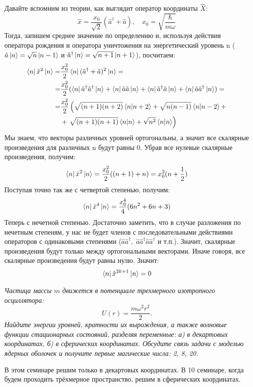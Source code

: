 Давайте вспомним из теории, как выглядит оператор координаты $\hat X$: 
\[
\hat x = \frac{x_0}{\sqrt{2}}(\hat a^{\dagger} + \hat a),\quad x_0 = \sqrt{\frac{\hbar}{m\omega}}
\]
Тогда, запишем среднее значение по определению и, используя действия оператора рождения и оператора уничтожения на энергетический уровень n ($\hat a\ket{n} = \sqrt{n}\ket{n-1}$ и $\hat{a}^{\dagger}\ket{n} = \sqrt{n+1}\ket{n+1}$), посчитаем:
\begin{align*}
    \bra{n}\hat x^2 \ket{n} = &\frac{x^2_0}{2}\bra{n}(\hat a^{\dagger} + \hat a)^2\ket{n} =\\
    = &\frac{x^2_0}{2}(\bra{n}\hat a^{\dagger}\hat a^{\dagger}\ket{n} +\bra{n}\hat a\hat a\ket{n} + \bra{n}\hat a^{\dagger}\hat a\ket{n} + \bra{n}\hat a\hat a^{\dagger}\ket{n}) =\\
    = &\frac{x^2_0}{2}\left(\sqrt{(n+1)(n+2)}\bra{n}\ket{n+2} + \sqrt{n(n-1)}\bra{n}\ket{n-2} + \right.\\ &+ \left. \sqrt{(n+1)(n+1)}\bra{n}\ket{n} + \sqrt{n^2}\bra{n}\ket{n}\right)
\end{align*}
Мы знаем, что векторы различных уровней ортогональны, а значит все скалярные произведения для различных n будут равны 0. Убрав все нулевые скалярные произведения, получим:
\[
\bra{n}\hat x^2\ket{n} = \frac{x^2_0}{2}((n+1) + n) = x^2_0(n + \frac{1}{2})
\]
Поступая точно так же с четвертой степенью, получим:
\[
\bra{n}\hat x^4\ket{n} = \frac{x_0^4}{4}(6n^2 + 6n + 3)
\]
Теперь с нечетной степенью. Достаточно заметить, что в случае разложения по нечетным степеням, у нас не будет членов с последовательными действиями операторов с одинаковыми степенями ($\hat a\hat a^{\dagger},\; \hat a\hat a^{\dagger}\hat a\hat a^{\dagger}$ и т.п.). Значит, скалярные произведения будут только между ортогональными векторами. Иначе говоря, все скалярные произведения будут равны нулю. Значит: 
\[
\bra{n}\hat x^{2k+1}\ket{n} = 0
\]
\begin{center}
    \textit{Частица массы $m$ движется в потенциале трехмерного изотропного осциллятора:}
    \[
    U(r) = \frac{m\omega^2r^2}{2}.
    \]
    \textit{Найдите энергии уровней, кратности их вырождения, а также волновые функции стационарных состояний, разделяя переменные: а) в декартовых координатах, б) в сферических координатах. Обсудите связь задачи с моделью ядерных оболочек и получите первые магические числа: 2, 8, 20.}
\end{center}

В этом семинаре решим только в декартовых координатах. В 10 семинаре, когда будем проходить трёхмерное пространство, решим в сферических координатах.

